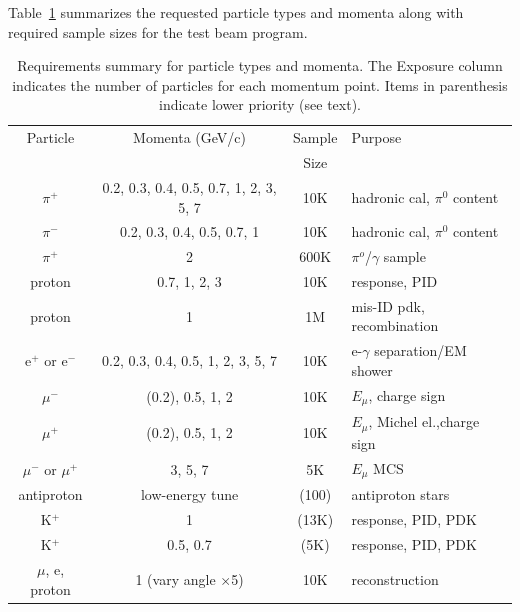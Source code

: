 Table~\ref{tab:runsum} summarizes the requested particle types and momenta along with 
required sample sizes for the test beam program.
\begin{table}[h]
\centering
\begin{tabular}{|c|c|c|l|}
\hline
Particle & Momenta (GeV/c) & Sample & Purpose \\ 
 &  &  Size &  \\ \hline \hline
$\pi^+$       & 0.2, 0.3, 0.4, 0.5, 0.7, 1, 2, 3, 5, 7     &  10K  & hadronic cal, $\pi^0$ content \\ \hline
$\pi^-$       &  0.2, 0.3, 0.4, 0.5, 0.7, 1     &  10K  & hadronic cal, $\pi^0$ content \\ \hline
$\pi^+$   &  2  &  600K & $\pi^o$/$\gamma$ sample \\ \hline
proton &  0.7, 1, 2, 3   &  10K & response, PID \\ \hline
proton &  1   &  1M & mis-ID pdk, recombination \\ \hline
e$^+$ or e$^-$       &    0.2, 0.3, 0.4, 0.5, 1, 2, 3, 5, 7        &    10K   & e-$\gamma$ separation/EM shower     \\ \hline
$\mu^-$  &   (0.2), 0.5, 1, 2  &  10K & $E_\mu$, charge sign \\ \hline
$\mu^+$ &   (0.2), 0.5, 1, 2   &  10K & $E_\mu$, Michel el.,charge sign  \\ \hline
$\mu^-$ or $\mu^+$ &   3, 5, 7  &  5K & $E_\mu$ MCS \\ \hline
antiproton &  low-energy tune  &  (100) & antiproton stars \\ \hline
K$^+$  & 1 & (13K)   &   response, PID, PDK  \\ \hline
K$^+$  & 0.5, 0.7 & (5K)   &   response, PID, PDK  \\ \hline \hline
$\mu$, e, proton  & 1 (vary angle $\times$5) & 10K  & reconstruction  \\ \hline
\end{tabular}
\caption{Requirements summary for particle types and momenta.
The Exposure column indicates the number of particles for each momentum point.
Items in parenthesis indicate lower priority (see text).
}
\label{tab:runsum}
\end{table}


